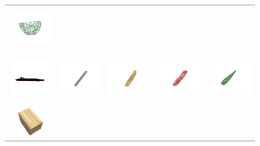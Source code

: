 \documentclass[bachelor, nocolorlinks, printoneside]{seuthesis} %
\begin{document}
\begin{Appendix}{}
\begin{figure}[!h]
\begin{tabular}{c@{}c@{}c@{}c@{}c@{}}
            \includegraphics[width=0.18\columnwidth,height=2cm]{figs/supp_real_dataset/oracle/pot_490e2e25da735cfd3df324363ca0723f_oracle.png} \\
            \vspace{-5mm}
            \includegraphics[width=0.11\columnwidth,height=1.7cm]{figs/supp_real_dataset/Image/rocket_99314b704285c0ca16e3314677399d49.png} &
            \includegraphics[width=0.18\columnwidth,height=2cm]{figs/supp_real_dataset/GT/rocket_99314b704285c0ca16e3314677399d49_gt.png} &
            \includegraphics[width=0.18\columnwidth,height=2cm]{figs/supp_real_dataset/AE_label/rocket_99314b704285c0ca16e3314677399d49_label.png} &
            \includegraphics[width=0.18\columnwidth,height=2cm]{figs/supp_real_dataset/AE/rocket_99314b704285c0ca16e3314677399d49_pred.png} &
            \includegraphics[width=0.18\columnwidth,height=2cm]{figs/supp_real_dataset/oracle/rocket_99314b704285c0ca16e3314677399d49_oracle.png} \\
            \vspace{-5mm}
            \includegraphics[width=0.11\columnwidth,height=1.3cm]{figs/supp_real_dataset/Image/table_3942f02501161134c3bd24f986301745.png} &

\end{tabular}
\end{figure}
\end{Appendix}
\end{document}
